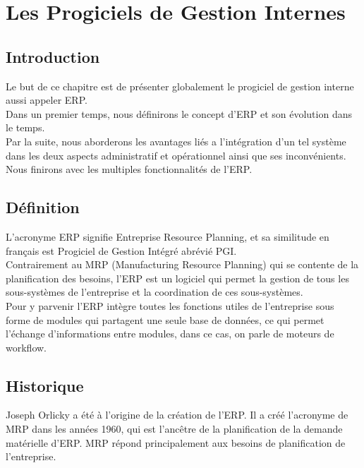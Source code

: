\chapter{Les Progiciels de Gestion Internes}

\section{Introduction}
Le but de ce chapitre est de présenter globalement le progiciel de gestion interne aussi appeler \acs{ERP}.\\

Dans un premier temps, nous définirons le concept d'\acs{ERP} et son évolution dans le temps.\\

Par la suite, nous aborderons les avantages liés a l'intégration d'un tel système dans les deux aspects administratif et opérationnel ainsi que ses inconvénients.\\

Nous finirons avec les multiples fonctionnalités de l'\acs{ERP}.\\

\section{Définition\cite{def-erp}}
L'acronyme \acs{ERP} signifie Entreprise Resource Planning, et sa similitude en français est Progiciel de Gestion Intégré abrévié \acs{PGI}.\\

Contrairement au \acs{MRP} (Manufacturing Resource Planning) qui se contente de la planification des besoins, l'\acs{ERP} est un logiciel qui permet la gestion de tous les sous-systèmes de l'entreprise et la coordination de ces sous-systèmes.\\

Pour y parvenir l’\acs{ERP} intègre toutes les fonctions utiles de l'entreprise sous forme de modules qui partagent une seule base de données, ce qui permet l'échange d'informations entre modules, dans ce cas, on parle de moteurs de workflow.\\

\section{Historique\cite{hist-erp}}
Joseph Orlicky a été à l'origine de la création de l'\acs{ERP}. Il a créé l'acronyme de \acs{MRP} dans les années 1960, qui est l'ancêtre de la planification de la demande matérielle d'\acs{ERP}. \acs{MRP} répond principalement aux besoins de planification de l'entreprise.\\

